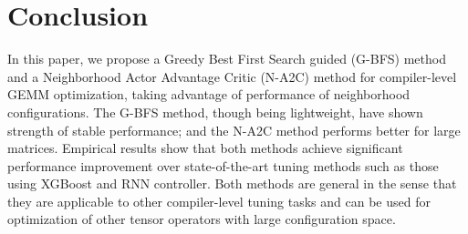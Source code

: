 \documentclass{article}
\begin{document}
\section{Conclusion}
In this paper, we propose a Greedy Best First Search guided (G-BFS) method and a Neighborhood Actor Advantage Critic (N-A2C) method for compiler-level GEMM optimization, taking advantage of performance of neighborhood configurations. The G-BFS method, though being lightweight, have shown strength of stable performance; and the N-A2C method performs better for large matrices. Empirical results show that both methods achieve significant performance improvement over  state-of-the-art tuning methods such as those using XGBoost and RNN controller. Both methods are general in the sense that they are applicable to other compiler-level tuning tasks and can be used for optimization of other tensor operators with large configuration space.

{
\begin{spacing}{0.92}
\footnotesize


\end{spacing}
}
\end{document}

